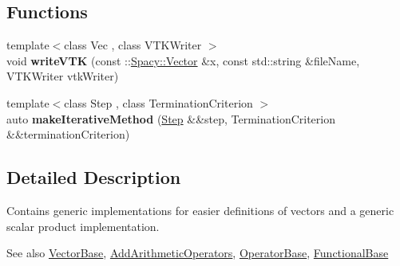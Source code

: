 \subsection*{\-Functions}
\begin{DoxyCompactItemize}
\item 
\hypertarget{namespaceSpacy_1_1Generic_a2507c0093c30bbad744a860e4cbe54d4}{{\footnotesize template$<$class Vec , class V\-T\-K\-Writer $>$ }\\void {\bfseries write\-V\-T\-K} (const \-::\hyperlink{classSpacy_1_1Vector}{\-Spacy\-::\-Vector} \&x, const std\-::string \&file\-Name, \-V\-T\-K\-Writer vtk\-Writer)}\label{namespaceSpacy_1_1Generic_a2507c0093c30bbad744a860e4cbe54d4}

\item 
\hypertarget{namespaceSpacy_1_1Generic_a3088c967001284a5f281082fa19168b0}{{\footnotesize template$<$class Step , class Termination\-Criterion $>$ }\\auto {\bfseries make\-Iterative\-Method} (\hyperlink{classSpacy_1_1Generic_1_1Step}{\-Step} \&\&step, \-Termination\-Criterion \&\&termination\-Criterion)}\label{namespaceSpacy_1_1Generic_a3088c967001284a5f281082fa19168b0}

\end{DoxyCompactItemize}


\subsection{\-Detailed \-Description}
\-Contains generic implementations for easier definitions of vectors and a generic scalar product implementation. \begin{DoxySeeAlso}{\-See also}
\hyperlink{classSpacy_1_1VectorBase}{\-Vector\-Base}, \hyperlink{classSpacy_1_1AddArithmeticOperators}{\-Add\-Arithmetic\-Operators}, \hyperlink{classSpacy_1_1OperatorBase}{\-Operator\-Base}, \hyperlink{classSpacy_1_1FunctionalBase}{\-Functional\-Base} 
\end{DoxySeeAlso}
